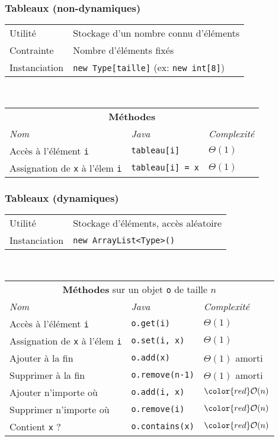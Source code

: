 \documentclass[8pt,aspectratio=169]{beamer}
\begin{document}
\begin{frame}
\frametitle{Tableaux (non-dynamiques)}
\centering
\begin{tabular}{lll}
	Utilité & \multicolumn{2}{l}{Stockage d'un nombre connu d'éléments}\\
	Contrainte & \multicolumn{2}{l}{Nombre d'éléments fixés}\\
	Instanciation & \multicolumn{2}{l}{\texttt{new Type[taille]} (ex: \texttt{new int[8]})}\\
\end{tabular}\\
\vspace{0.5cm}
\centering
\begin{tabular}{lll}
	\multicolumn{3}{c}{\textbf{Méthodes}} \\
	\textit{Nom} & \textit{Java} & \textit{Complexité} \\
	Accès à l'élément \texttt{i} & \texttt{tableau[i]} & $\Theta(1)$\\
	Assignation de \texttt{x} à l'élem \texttt{i} & \texttt{tableau[i] = x} & $\Theta(1)$\\
\end{tabular}
\end{frame}

\begin{frame}
\frametitle{Tableaux (dynamiques)}
\centering
\begin{tabular}{ll}
	Utilité & Stockage d'éléments, accès aléatoire\\
	Instanciation & \texttt{new ArrayList<Type>()}\\
\end{tabular}\\
\vspace{0.5cm}
\centering
\begin{tabular}{lll}
	\multicolumn{3}{c}{\textbf{Méthodes} sur un objet \texttt{o} de taille $n$} \\
	\textit{Nom} & \textit{Java} & \textit{Complexité} \\
	Accès à l'élément \texttt{i} & \texttt{o.get(i)} & $\Theta(1)$\\
	Assignation de \texttt{x} à l'élem \texttt{i} & \texttt{o.set(i, x)} & $\Theta(1)$\\
	Ajouter à la fin & \texttt{o.add(x)} & $\Theta(1)$ \color{orange}amorti\\
	Supprimer à la fin & \texttt{o.remove(n-1)} & $\Theta(1)$ \color{orange}amorti\\
	Ajouter n'importe où & \texttt{o.add(i, x)} & $\color{red}\mathcal{O}(n)$\\
	Supprimer n'importe où & \texttt{o.remove(i)} & $\color{red}\mathcal{O}(n)$\\
	Contient \texttt{x} ? & \texttt{o.contains(x)} & $\color{red}\mathcal{O}(n)$\\
\end{tabular}
\end{frame}
\end{document}
